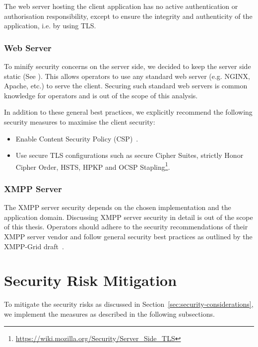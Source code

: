 The web server hosting the client application has no active authentication or authorisation responsibility, except to ensure the integrity and authenticity of the application, i.e. by using TLS.

\subsubsection{Web Server}\label{sec:web-server}

To minify security concerns on the server side, we decided to keep the server side static (See ).
This allows operators to use any standard web server (e.g. NGINX, Apache, etc.) to serve the client.
Securing such standard web servers is common knowledge for operators and is out of the scope of this analysis.

In addition to these general best practices, we explicitly recommend the following security measures to maximise the client security:

\begin{itemize}
    \item Enable Content Security Policy (CSP)~\cite{w3c-csp}.
    \item Use secure TLS configurations such as secure Cipher Suites, strictly Honor Cipher Order, HSTS, HPKP and OCSP Stapling\footnote{\url{https://wiki.mozilla.org/Security/Server_Side_TLS}}.
\end{itemize}


\subsubsection{XMPP Server}

The XMPP server security depends on the chosen implementation and the application domain.
Discussing XMPP server security in detail is out of the scope of this thesis.
Operators should adhere to the security recommendations of their XMPP server vendor and follow general security best practices as outlined by the XMPP-Grid draft~\cite{ietf-mile-xmpp-grid-05}.

\section{Security Risk Mitigation}

To mitigate the security risks as discussed in Section~\ref{sec:security-considerations}, we implement the measures as described in the following subsections.

